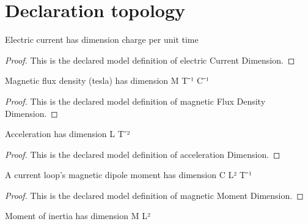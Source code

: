 \section{Declaration topology}
\begin{definition}
  \label{def:physics:phyx-mini-0954:phyxminiproblems-problemphyxmini0954-electriccurrentdimension}
  Electric current has dimension charge per unit time
\end{definition}
\begin{proof}
  This is the declared model definition of electric Current Dimension.
\end{proof}
\begin{definition}
  \label{def:physics:phyx-mini-0954:phyxminiproblems-problemphyxmini0954-magneticfluxdensitydimension}
  Magnetic flux density (tesla) has dimension M T⁻¹ C⁻¹
\end{definition}
\begin{proof}
  This is the declared model definition of magnetic Flux Density Dimension.
\end{proof}
\begin{definition}
  \label{def:physics:phyx-mini-0954:phyxminiproblems-problemphyxmini0954-accelerationdimension}
  Acceleration has dimension L T⁻²
\end{definition}
\begin{proof}
  This is the declared model definition of acceleration Dimension.
\end{proof}
\begin{definition}
  \label{def:physics:phyx-mini-0954:phyxminiproblems-problemphyxmini0954-magneticmomentdimension}
  A current loop's magnetic dipole moment has dimension C L² T⁻¹
\end{definition}
\begin{proof}
  This is the declared model definition of magnetic Moment Dimension.
\end{proof}
\begin{definition}
  \label{def:physics:phyx-mini-0954:phyxminiproblems-problemphyxmini0954-momentofinertiadimension}
  Moment of inertia has dimension M L²
\end{definition}
